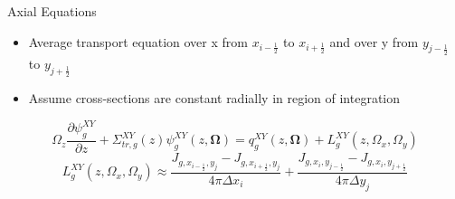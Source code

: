 \begin{frame}[t]{Axial Equations}

\begin{itemize}
  \item Average transport equation over x from $x_{i-\frac{1}{2}}$ to 
  $x_{i+\frac{1}{2}}$ and over y from $y_{j-\frac{1}{2}}$ to $y_{j+\frac{1}{2}}$
  \item Assume cross-sections are constant radially in region of integration
\end{itemize}
\begin{dmath*}
{\Omega_z \frac{\partial \psi_{g}^{XY}}{\partial z}} + 
{\Sigma_{tr,g}^{XY}\left(z\right)\psi_{g}^{XY}\left(z,\bm\Omega\right)} = 
q_{g}^{XY}\left(z,\bm\Omega\right) + 
{L_{g}^{XY}\left(z,\Omega_x,\Omega_y\right)}
\end{dmath*}
\begin{equation*}
L_{g}^{XY}\left(z,\Omega_x,\Omega_y\right) \approx 
{\frac{J_{g,x_{i-\frac{1}{2}},y_j} - 
  J_{g,x_{i+\frac{1}{2}},y_j}}{4\pi\Delta x_i}} +
\frac{J_{g,x_i,y_{j-\frac{1}{2}}} - J_{g,x_i,y_{j+\frac{1}{2}}}}{4\pi\Delta 
y_j}
\end{equation*}

\end{frame}


